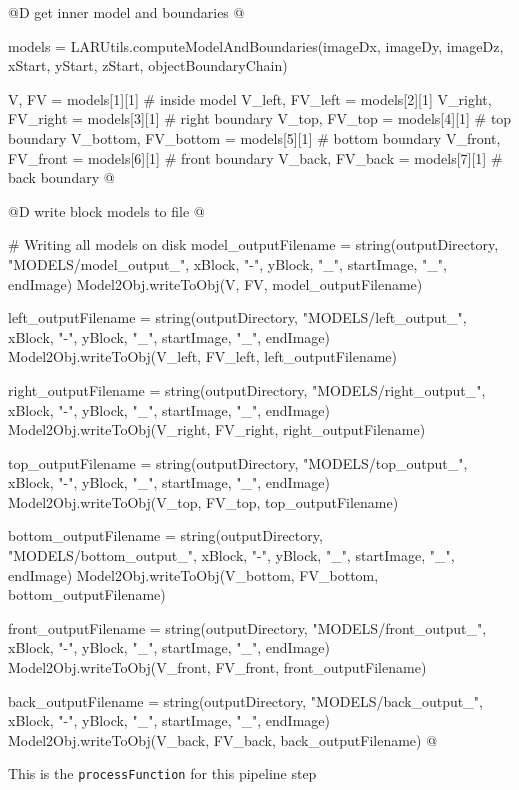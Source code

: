 \documentclass[11pt,oneside]{article}	%
\begin{document}
@D get inner model and boundaries
@{models = LARUtils.computeModelAndBoundaries(imageDx, imageDy, imageDz,
					    xStart, yStart, zStart, objectBoundaryChain)

V, FV = models[1][1] # inside model
V_left, FV_left = models[2][1]
V_right, FV_right = models[3][1] # right boundary
V_top, FV_top = models[4][1] # top boundary
V_bottom, FV_bottom = models[5][1] # bottom boundary
V_front, FV_front = models[6][1] # front boundary
V_back, FV_back = models[7][1] # back boundary
@}

@D write block models to file
@{# Writing all models on disk
model_outputFilename = string(outputDirectory, "MODELS/model_output_", xBlock,
				"-", yBlock, "_", startImage, "_", endImage)
Model2Obj.writeToObj(V, FV, model_outputFilename)

left_outputFilename = string(outputDirectory, "MODELS/left_output_", xBlock,
				"-", yBlock, "_", startImage, "_", endImage)
Model2Obj.writeToObj(V_left, FV_left, left_outputFilename)

right_outputFilename = string(outputDirectory, "MODELS/right_output_", xBlock,
				"-", yBlock, "_", startImage, "_", endImage)
Model2Obj.writeToObj(V_right, FV_right, right_outputFilename)

top_outputFilename = string(outputDirectory, "MODELS/top_output_", xBlock,
				"-", yBlock, "_", startImage, "_", endImage)
Model2Obj.writeToObj(V_top, FV_top, top_outputFilename)

bottom_outputFilename = string(outputDirectory, "MODELS/bottom_output_", xBlock,
				"-", yBlock, "_", startImage, "_", endImage)
Model2Obj.writeToObj(V_bottom, FV_bottom, bottom_outputFilename)

front_outputFilename = string(outputDirectory, "MODELS/front_output_", xBlock,
				"-", yBlock, "_", startImage, "_", endImage)
Model2Obj.writeToObj(V_front, FV_front, front_outputFilename)

back_outputFilename = string(outputDirectory, "MODELS/back_output_", xBlock,
				"-", yBlock, "_", startImage, "_", endImage)
Model2Obj.writeToObj(V_back, FV_back, back_outputFilename) @}

This is the \texttt{processFunction} for this pipeline step
\end{document}
